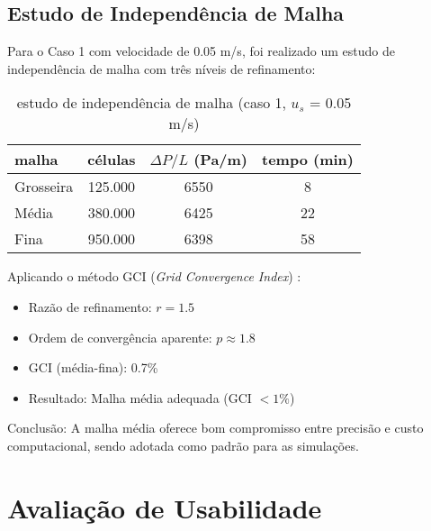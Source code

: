 
\subsection{Estudo de Independência de Malha}

Para o Caso 1 com velocidade de 0.05 m/s, foi realizado um estudo de independência de malha com três níveis de refinamento:

\begin{table}[htb]
\centering
\caption{estudo de independência de malha (caso 1, $u_s$ = 0.05 m/s)}
\label{tab:gci}
\begin{tabular}{lccc}
\toprule
\textbf{malha} & \textbf{células} & \textbf{$\Delta P/L$ (Pa/m)} & \textbf{tempo (min)} \\
\midrule
Grosseira & 125.000 & 6550 & 8 \\
Média & 380.000 & 6425 & 22 \\
Fina & 950.000 & 6398 & 58 \\
\bottomrule
\end{tabular}
\end{table}

Aplicando o método GCI (\textit{Grid Convergence Index}) \cite{roache1994}:

\begin{itemize}
    \item Razão de refinamento: $r = 1.5$
    \item Ordem de convergência aparente: $p \approx 1.8$
    \item GCI (média-fina): 0.7\%
    \item Resultado: Malha média adequada (GCI $< 1\%$)
\end{itemize}

Conclusão: A malha média oferece bom compromisso entre precisão e custo computacional, sendo adotada como padrão para as simulações.

\section{Avaliação de Usabilidade}

